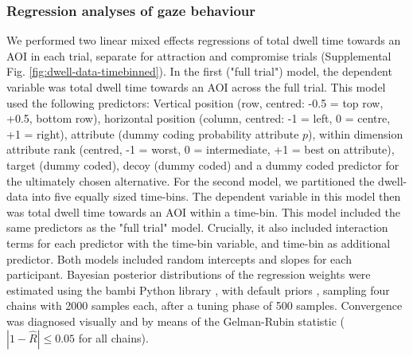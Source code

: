 \documentclass[11pt, a4paper]{article}
\begin{document}
\begin{refsection}
\subsubsection*{Regression analyses of gaze behaviour}
We performed two linear mixed effects regressions of total dwell time towards an AOI in each trial, separate for attraction and compromise trials (Supplemental Fig. \ref{fig:dwell-data-timebinned}). In the first ("full trial") model, the dependent variable was total dwell time towards an AOI across the full trial. This model used the following predictors: Vertical position (row, centred: -0.5 = top row, +0.5, bottom row), horizontal position (column, centred: -1 = left, 0 = centre, +1 = right), attribute (dummy coding probability attribute $p$), within dimension attribute rank (centred, -1 = worst, 0 = intermediate, +1 = best on attribute), target (dummy coded), decoy (dummy coded) and a dummy coded predictor for the ultimately chosen alternative. For the second model, we partitioned the dwell-data into five equally sized time-bins. The dependent variable in this model then was total dwell time towards an AOI within a time-bin. This model included the same predictors as the "full trial" model. Crucially, it also included interaction terms for each predictor with the time-bin variable, and time-bin as additional predictor. Both models included random intercepts and slopes for each participant. Bayesian posterior distributions of the regression weights were estimated using the bambi Python library \parencite{yarkoni2016BambiSimpleInterface}, with default priors \parencite{westfall2017StatisticalDetailsDefault}, sampling four chains with 2000 samples each, after a tuning phase of 500 samples. Convergence was diagnosed visually and by means of the Gelman-Rubin statistic ($|1 - \hat{R}| \le 0.05$ for all chains).


\end{refsection}
\end{document}

